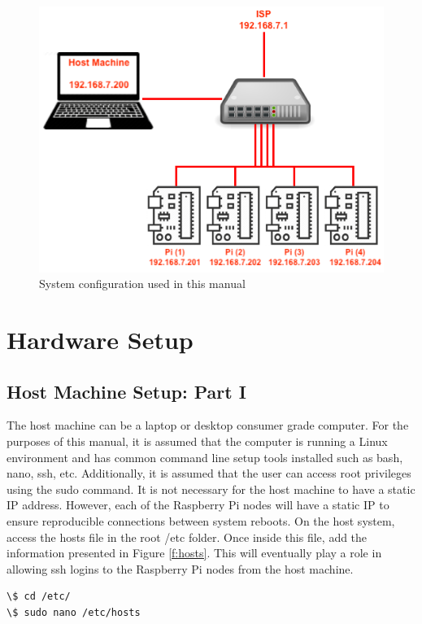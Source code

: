 \documentclass[sigconf]{acmart}
\begin{document}
\begin{figure}[!ht]
  \centering\includegraphics[width=\columnwidth]{images/system.png}
  \caption{System configuration used in this manual}\label{f:system}
\end{figure}

\section{Hardware Setup}

\subsection{Host Machine Setup: Part I}

The host machine can be a laptop or desktop consumer grade computer. For the purposes of this manual, it is assumed that the computer is running a Linux environment and has common command line setup tools installed such as bash, nano, ssh, etc. Additionally, it is assumed that the user can access root privileges using the sudo command. It is not necessary for the host machine to have a static IP address. However, each of the Raspberry Pi nodes will have a static IP to ensure reproducible connections between system reboots. On the host system, access the hosts file in the root /etc folder. Once inside this file, add the information presented in Figure \ref{f:hosts}. This will eventually play a role in allowing ssh logins to the Raspberry Pi nodes from the host machine.

\begin{lstlisting}
\$ cd /etc/
\$ sudo nano /etc/hosts
\end{lstlisting}
\end{document}
